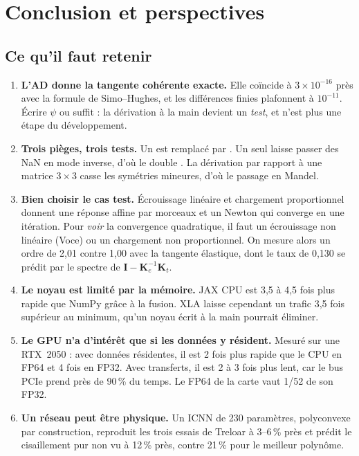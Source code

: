 \section{Conclusion et perspectives}

\subsection{Ce qu'il faut retenir}

\begin{retenir}
\begin{enumerate}[nosep,leftmargin=*]
  \item \textbf{L'AD donne la tangente cohérente exacte.} Elle coïncide à $3\times10^{-16}$ près avec la formule de Simo--Hughes, et les différences finies plafonnent à $10^{-11}$. Écrire $\psi$ ou  suffit : la dérivation à la main devient un \emph{test}, et n'est plus une étape du développement.
  \item \textbf{Trois pièges, trois tests.} Un  est remplacé par . Un  seul laisse passer des NaN en mode inverse, d'où le double . La dérivation par rapport à une matrice $3\times3$ casse les symétries mineures, d'où le passage en Mandel.
  \item \textbf{Bien choisir le cas test.} Écrouissage linéaire et chargement proportionnel donnent une réponse affine par morceaux et un Newton qui converge en une itération. Pour \emph{voir} la convergence quadratique, il faut un écrouissage non linéaire (Voce) ou un chargement non proportionnel. On mesure alors un ordre de 2,01 contre 1,00 avec la tangente élastique, dont le taux de 0,130 se prédit par le spectre de $\mathbf{I}-\mathbf{K}_e^{-1}\mathbf{K}_t$.
  \item \textbf{Le noyau est limité par la mémoire.} JAX CPU est 3,5 à 4,5 fois plus rapide que NumPy grâce à la fusion. XLA laisse cependant un trafic 3,5 fois supérieur au minimum, qu'un noyau écrit à la main pourrait éliminer.
  \item \textbf{Le GPU n'a d'intérêt que si les données y résident.} Mesuré sur une RTX~2050 : avec données résidentes, il est 2 fois plus rapide que le CPU en FP64 et 4 fois en FP32. Avec transferts, il est 2 à 3 fois plus lent, car le bus PCIe prend près de 90\,\% du temps. Le FP64 de la carte vaut 1/52 de son FP32.
  \item \textbf{Un réseau peut être physique.} Un ICNN de 230 paramètres, polyconvexe par construction, reproduit les trois essais de Treloar à 3--6\,\% près et prédit le cisaillement pur non vu à 12\,\% près, contre 21\,\% pour le meilleur polynôme.
\end{enumerate}
\end{retenir}

